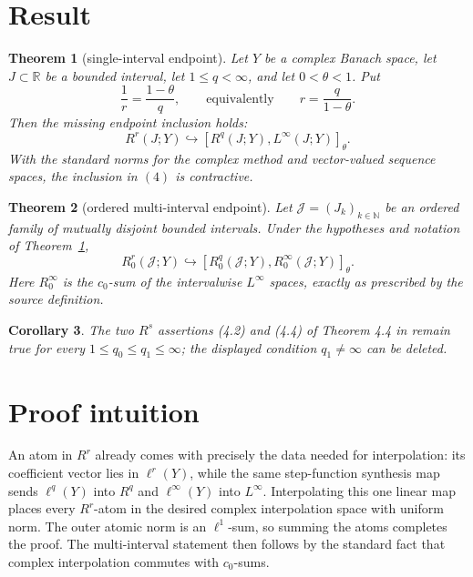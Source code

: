 \documentclass[10pt]{article}
\newtheorem{theorem}{Theorem}
\newtheorem{corollary}[theorem]{Corollary}
\newcommand{\N}{\mathbb N}
\newcommand{\cJ}{\mathcal J}
\newcommand{\1}{\mathbf 1}
\begin{document}
\section{Result}

\begin{theorem}[single-interval endpoint]\label{thm:single}
Let \(Y\) be a complex Banach space, let \(J\subset\mathbb R\) be a
bounded interval, let \(1\leq q<\infty\), and let
\(0<\theta<1\).  Put
\[
 \frac1r=\frac{1-\theta}{q},
 \qquad\text{equivalently}\qquad r=\frac{q}{1-\theta}.
\]
Then the missing endpoint inclusion holds:
\[
 R^r(J;Y)
 \hookrightarrow
 [R^q(J;Y),L^\infty(J;Y)]_\theta.
 \tag{4}
\]
With the standard norms for the complex method and vector-valued sequence
spaces, the inclusion in \((4)\) is contractive.
\end{theorem}

\begin{theorem}[ordered multi-interval endpoint]\label{thm:multi}
Let \(\cJ=(J_k)_{k\in\N}\) be an ordered family of mutually disjoint
bounded intervals.  Under the hypotheses and notation of
Theorem~\ref{thm:single},
\[
 R_0^r(\cJ;Y)
 \hookrightarrow
 [R_0^q(\cJ;Y),R_0^\infty(\cJ;Y)]_\theta.
 \tag{5}
\]
Here \(R_0^\infty\) is the \(c_0\)-sum of the intervalwise
\(L^\infty\) spaces, exactly as prescribed by the source definition.
\end{theorem}

\begin{corollary}
The two \(R^s\) assertions (4.2) and (4.4) of Theorem 4.4 in
\cite{ALV} remain true for every \(1\leq q_0\leq q_1\leq\infty\); the
displayed condition \(q_1\ne\infty\) can be deleted.
\end{corollary}

\section{Proof intuition}

An atom in \(R^r\) already comes with precisely the data needed for
interpolation: its coefficient vector lies in \(\ell^r(Y)\), while the
same step-function synthesis map sends \(\ell^q(Y)\) into \(R^q\) and
\(\ell^\infty(Y)\) into \(L^\infty\).  Interpolating this one linear map
places every \(R^r\)-atom in the desired complex interpolation space with
uniform norm.  The outer atomic norm is an \(\ell^1\)-sum, so summing the
atoms completes the proof.  The multi-interval statement then follows by
the standard fact that complex interpolation commutes with \(c_0\)-sums.
\end{document}
